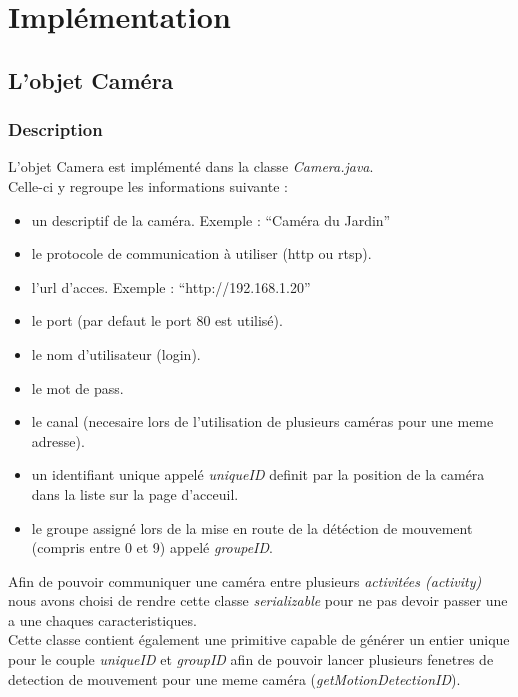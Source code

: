 \documentclass[a4paper,10pt]{report}
\begin{document}
\author{Jerome NAHELOU, Quentin NEBOUT, Romain SOLVE, Fabien QUINTARD}


\chapter[Implémentation]{Implémentation} 
\section{L'objet Caméra}
\subsection{Description}
L'objet Camera est implémenté dans la classe \textit{Camera.java}. \\
Celle-ci y regroupe les informations suivante : 
\begin{itemize} 
\item un descriptif de la caméra. Exemple : ``Caméra du Jardin''
\item le protocole de communication à utiliser (http ou rtsp).
\item l'url d'acces. Exemple : ``http://192.168.1.20''
\item le port (par defaut le port 80 est utilisé).
\item le nom d'utilisateur (login).
\item le mot de pass.
\item le canal (necesaire lors de l'utilisation de plusieurs caméras pour une
meme adresse).
\item un identifiant unique appelé \textit{uniqueID} definit par la position de
la caméra dans la liste sur la page d'acceuil.
\item le groupe assigné lors de la mise en route de la détéction de mouvement
(compris entre 0 et 9) appelé \textit{groupeID}.\\
\end{itemize}
Afin de pouvoir communiquer une caméra entre plusieurs \textit{activitées
(activity)} nous avons choisi de rendre cette classe \textit{serializable} pour
ne pas devoir passer une a une chaques caracteristiques.\\
Cette classe contient également une primitive capable de générer un entier
unique pour le couple \textit{uniqueID} et \textit{groupID} afin de pouvoir
lancer plusieurs fenetres de detection de mouvement pour une meme caméra
(\textit{getMotionDetectionID}).
\end{document}
